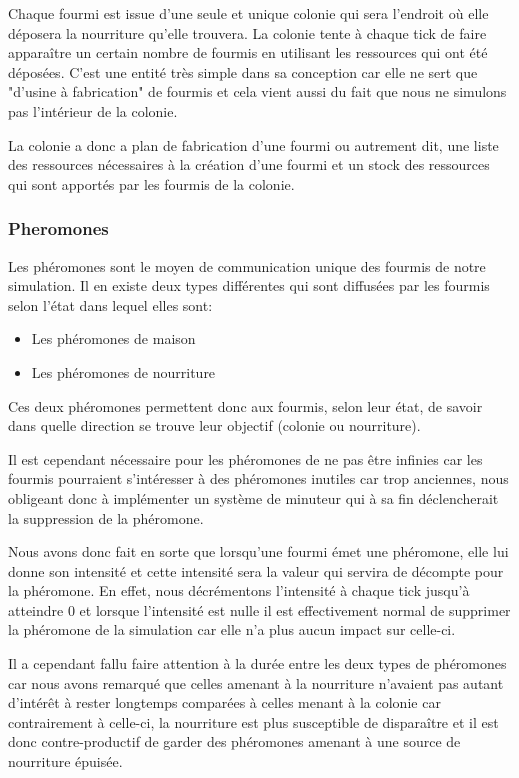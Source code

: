 \documentclass{EPUProjetDi}
\begin{document}
Chaque fourmi est issue d'une seule et unique colonie qui sera l'endroit où elle déposera la nourriture qu'elle trouvera. La colonie tente à chaque tick de
faire apparaître un certain nombre de fourmis en utilisant les ressources qui ont été déposées. C'est une entité très simple dans sa conception car elle
ne sert que "d'usine à fabrication" de fourmis et cela vient aussi du fait que nous ne simulons pas l'intérieur de la colonie.

La colonie a donc a plan de fabrication d'une fourmi ou autrement dit, une liste des ressources nécessaires à la création d'une fourmi et un stock
des ressources qui sont apportés par les fourmis de la colonie.

\subsubsection{Pheromones}

Les phéromones sont le moyen de communication unique des fourmis de notre simulation. Il en existe deux types différentes qui sont diffusées par
les fourmis selon l'état dans lequel elles sont:
\begin{itemize}
    \item Les phéromones de maison
    \item Les phéromones de nourriture
\end{itemize}

Ces deux phéromones permettent donc aux fourmis, selon leur état, de savoir dans quelle direction se trouve leur objectif (colonie ou nourriture).

Il est cependant nécessaire pour les phéromones de ne pas être infinies car les fourmis pourraient s'intéresser à des phéromones inutiles car trop anciennes, 
nous obligeant donc à implémenter un système de minuteur qui à sa fin déclencherait la suppression de la phéromone.

Nous avons donc fait en sorte que lorsqu'une fourmi émet une phéromone, elle lui donne son intensité et cette intensité sera la valeur qui servira de décompte
pour la phéromone. En effet, nous décrémentons l'intensité à chaque tick jusqu'à atteindre 0 et lorsque l'intensité est nulle il est effectivement normal 
de supprimer la phéromone de la simulation car elle n'a plus aucun impact sur celle-ci.

Il a cependant fallu faire attention à la durée entre les deux types de phéromones car nous avons remarqué que celles amenant à la nourriture n'avaient 
pas autant d'intérêt à rester longtemps comparées à celles menant à la colonie car contrairement à celle-ci, la nourriture est plus susceptible de 
disparaître et il est donc contre-productif de garder des phéromones amenant à une source de nourriture épuisée.
\end{document}

